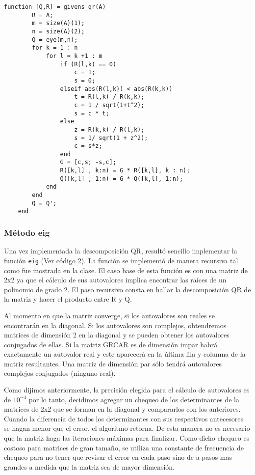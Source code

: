 \documentclass[a4paper,10pt]{article}
\begin{document}
\begin{lstlisting}[caption = Implementación de la descomposición QR con GS]
	function [Q,R] = givens_qr(A)
		R = A;
		m = size(A)(1);
		n = size(A)(2);
		Q = eye(m,n);
		for k = 1 : n
			for l = k +1 : m
				if (R(l,k) == 0)
					c = 1;
					s = 0;
				elseif abs(R(l,k)) < abs(R(k,k))
					t = R(l,k) / R(k,k);
					c = 1 / sqrt(1+t^2);
					s = c * t;
				else
					z = R(k,k) / R(l,k);
					s = 1/ sqrt(1 + z^2);
					c = s*z;
				end
				G = [c,s; -s,c];
				R([k,l] , k:n) = G * R([k,l], k : n);
				Q([k,l] , 1:n) = G * Q([k,l], 1:n);
			end
		end
		Q = Q';
	end
\end{lstlisting}




\subsubsection{Método eig}

Una vez implementada la descomposición QR, resultó sencillo implementar la función \texttt{eig} (Ver código 2). La función se implementó de manera recursiva tal como fue mostrada en la clase. El caso base de esta función es 
con una matriz de 2x2 ya que el cálculo de sus autovalores implica encontrar las raíces de un polinomio de grado 2. El paso recursivo consta en hallar la descomposición QR de la matriz  y hacer el producto entre R y Q.

Al momento en que la matriz converge, si los autovalores son reales se encontrarán en la diagonal. Si los autovalores son complejos, obtendremos matrices de dimensión 2 en la diagonal y se pueden obtener los autovalores conjugados de ellas. Si la matriz GRCAR es de dimensión impar habrá exactamente un autovalor real y este aparecerá en la última fila y columna de la matriz resultantes. Una matriz de dimensión par sólo tendrá autovalores complejos conjugados (ninguno real).

Como dijimos anteriormente, la precisión elegida para el cálculo de autovalores es de $10^{-4}$ por lo tanto, decidimos agregar un chequeo de los determinantes de la matrices de 2x2 que se forman en la diagonal y compararlos con los anteriores. Cuando la diferencia de todos los determinantes con sus respectivos antecesores se hagan menor que el error, el algoritmo retorna. De esta manera no es necesario que la matriz haga las iteraciones máximas para finalizar. Como dicho chequeo es costoso para matrices de gran tamaño, se utiliza una constante de frecuencia de chequeo para no tener que revisar el error en cada paso sino de a pasos mas grandes a medida que la matriz sea de mayor dimensión.
\end{document}

